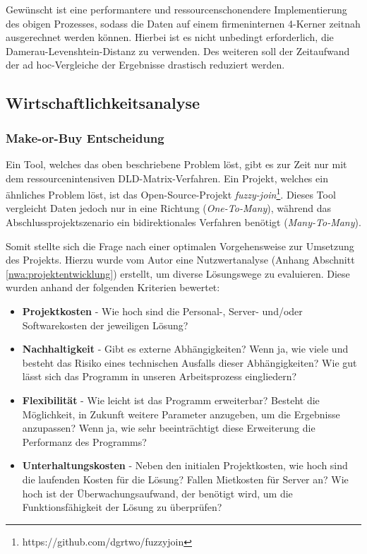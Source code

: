 Gewünscht ist eine performantere und ressourcenschonendere Implementierung des obigen Prozesses,
sodass die Daten auf einem firmeninternen 4-Kerner zeitnah ausgerechnet werden können.
Hierbei ist es nicht unbedingt erforderlich, die Damerau-Levenshtein-Distanz zu verwenden. Des weiteren soll der Zeitaufwand der ad hoc-Vergleiche der Ergebnisse drastisch reduziert werden.\par




\subsection{Wirtschaftlichkeitsanalyse}
\subsubsection{Make-or-Buy Entscheidung}
Ein Tool, welches das oben beschriebene Problem löst, gibt es zur Zeit nur mit dem
ressourcenintensiven DLD-Matrix-Verfahren. Ein Projekt, welches ein ähnliches
Problem löst, ist das Open-Source-Projekt \textit{fuzzy-join}\footnote{https://github.com/dgrtwo/fuzzyjoin}.
Dieses Tool vergleicht Daten jedoch nur in eine Richtung (\textit{One-To-Many}), während das Abschlussprojektszenario ein bidirektionales Verfahren benötigt (\textit{Many-To-Many}).\par

Somit stellte sich die Frage nach einer optimalen Vorgehensweise zur Umsetzung des
Projekts. Hierzu wurde vom Autor eine Nutzwertanalyse (Anhang Abschnitt \ref{nwa:projektentwicklung}) erstellt, um diverse Lösungswege zu evaluieren.
Diese wurden anhand der folgenden Kriterien bewertet:


\begin{itemize}
    \item \textbf{Projektkosten} - Wie hoch sind die Personal-, Server- und/oder Softwarekosten der jeweiligen Lösung?

    \item \textbf{Nachhaltigkeit} - Gibt es externe Abhängigkeiten? Wenn ja, wie viele und besteht das Risiko eines technischen Ausfalls dieser Abhängigkeiten? Wie gut lässt sich das Programm in unseren Arbeitsprozess eingliedern? 

    \item \textbf{Flexibilität} - Wie leicht ist das Programm erweiterbar? Besteht die Möglichkeit, in Zukunft weitere Parameter anzugeben, um die Ergebnisse anzupassen? Wenn ja, wie sehr beeinträchtigt diese Erweiterung die Performanz des Programms?

    \item \textbf{Unterhaltungskosten} - Neben den initialen Projektkosten, wie hoch sind die laufenden Kosten für die Lösung? Fallen Mietkosten für Server an? Wie hoch ist der Überwachungsaufwand, der benötigt wird, um die Funktionsfähigkeit der Lösung zu überprüfen?

\end{itemize}



